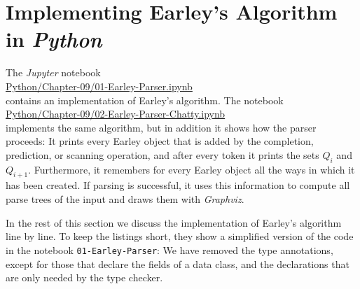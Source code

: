 \section{Implementing Earley's Algorithm in \textsl{Python}}
The \textsl{Jupyter} notebook
\\[0.2cm]
\hspace*{1.3cm}
\href{https://github.com/karlstroetmann/Formal-Languages/blob/master/Python/Chapter-09/01-Earley-Parser.ipynb}{Python/Chapter-09/01-Earley-Parser.ipynb}
\\[0.2cm]
contains an implementation of Earley's algorithm.  The notebook
\\[0.2cm]
\hspace*{1.3cm}
\href{https://github.com/karlstroetmann/Formal-Languages/blob/master/Python/Chapter-09/02-Earley-Parser-Chatty.ipynb}{Python/Chapter-09/02-Earley-Parser-Chatty.ipynb}
\\[0.2cm]
implements the same algorithm, but in addition it shows how the parser proceeds:  It prints every Earley object
that is added by the completion, prediction, or scanning operation, and after every token it prints the sets $Q_i$
and $Q_{i+1}$.  Furthermore, it remembers for every Earley object all the ways in which it has been created.  If
parsing is successful, it uses this information to compute all parse trees of the input and draws them with
\textsl{Graphviz}.

In the rest of this section we discuss the implementation of Earley's algorithm line by line.  To keep the
listings short, they show a simplified version of the code in the notebook \texttt{01-Earley-Parser}:  We have
removed the type annotations, except for those that declare the fields of a data class, and the declarations that
are only needed by the type checker.

